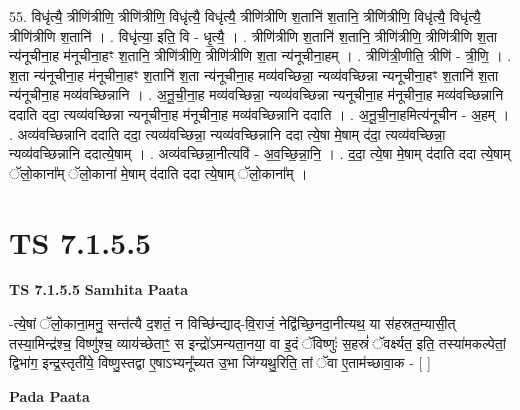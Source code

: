 \documentclass[17pt]{extarticle}
\begin{document}
55. विधृ॑त्यै॒ त्रीणि॑त्रीणि॒ त्रीणि॑त्रीणि॒ विधृ॑त्यै॒ विधृ॑त्यै॒ त्रीणि॑त्रीणि श॒तानि॑ श॒तानि॒ त्रीणि॑त्रीणि॒ विधृ॑त्यै॒ विधृ॑त्यै॒ त्रीणि॑त्रीणि श॒तानि॑ । . विधृ॑त्या॒ इति॒ वि - धृ॒त्यै॒ । . त्रीणि॑त्रीणि श॒तानि॑ श॒तानि॒ त्रीणि॑त्रीणि॒ त्रीणि॑त्रीणि श॒ता न्य॑नूचीना॒ह म॑नूचीना॒हꣳ श॒तानि॒ त्रीणि॑त्रीणि॒ त्रीणि॑त्रीणि श॒ता न्य॑नूचीना॒हम् । . त्रीणि॑त्री॒णीति॒ त्रीणि॑ - त्री॒णि॒ । . श॒ता न्य॑नूचीना॒ह म॑नूचीना॒हꣳ श॒तानि॑ श॒ता न्य॑नूचीना॒ह मव्य॑वच्छिन्ना॒ न्यव्य॑वच्छिन्ना
न्यनूचीना॒हꣳ श॒तानि॑ श॒ता न्य॑नूचीना॒ह मव्य॑वच्छिन्नानि । . अ॒नू॒ची॒ना॒ह मव्य॑वच्छिन्ना॒ न्यव्य॑वच्छिन्ना न्यनूचीना॒ह म॑नूचीना॒ह मव्य॑वच्छिन्नानि ददाति ददा॒ त्यव्य॑वच्छिन्ना न्यनूचीना॒ह म॑नूचीना॒ह मव्य॑वच्छिन्नानि ददाति । . अ॒नू॒ची॒ना॒हमित्य॑नूचीन - अ॒हम् । . अव्य॑वच्छिन्नानि ददाति ददा॒ त्यव्य॑वच्छिन्ना॒ न्यव्य॑वच्छिन्नानि ददा त्ये॒षा मे॒षाम् द॑दा॒ त्यव्य॑वच्छिन्ना॒
न्यव्य॑वच्छिन्नानि ददात्ये॒षाम् । . अव्य॑वच्छिन्ना॒नीत्यवि॑ - अ॒व॒च्छि॒न्ना॒नि॒ । . द॒दा॒ त्ये॒षा मे॒षाम् द॑दाति ददा त्ये॒षाम् ॅलो॒काना᳚म् ॅलो॒काना॑ मे॒षाम् द॑दाति ददा त्ये॒षाम् ॅलो॒काना᳚म् । \newline
\pagebreak
{}

\section{ TS 7.1.5.5 }

\textbf{TS 7.1.5.5 } \newline
\textbf{Samhita Paata} \newline

-त्ये॒षां ॅलो॒काना॒मनु॒ सन्त॑त्यै द॒शतं॒ न विच्छि॑न्द्याद्-वि॒राजं॒ नेद्वि॑च्छि॒नदा॒नीत्यथ॒ या स॑हस्रत॒म्यासी॒त् तस्या॒मिन्द्र॑श्च॒ विष्णु॑श्च॒ व्याय॑च्छेताꣳ॒॒ स इन्द्रो॑ऽमन्यता॒नया॒ वा इ॒दं ॅविष्णुः॑ स॒हस्रं॑ ॅवर्क्ष्यत॒ इति॒ तस्या॑मकल्पेतां॒ द्विभा॑ग॒ इन्द्र॒स्तृती॑ये॒ विष्णु॒स्तद्वा ए॒षाऽभ्यनू᳚च्यत उ॒भा जि॑ग्यथु॒रिति॒ तां ॅवा ए॒ताम॑च्छावा॒क - [  ] \newline

\textbf{Pada Paata} \newline
\end{document}
